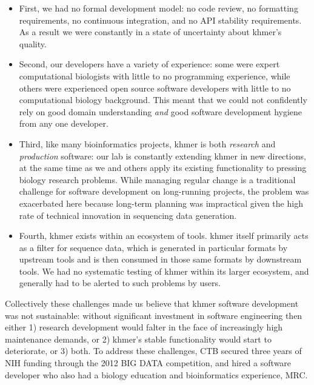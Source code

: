 \documentclass[11pt]{article}
\begin{document}
\begin{itemize}
\item First, we had no formal development model: no code review, no
  formatting requirements, no continuous integration, and no API
  stability requirements.  As a result we were constantly in a
  state of uncertainty about khmer's quality.

\item Second, our developers have a variety of experience: some were
  expert computational biologists with little to no programming
  experience, while others were experienced open source software
  developers with little to no computational biology background.  This
  meant that we could not confidently rely on good domain
  understanding {\em and} good software development hygiene from any
  one developer.

\item Third, like many bioinformatics projects, khmer is both {\em
  research} and {\em production} software: our lab is constantly
  extending khmer in new directions, at the same time as we and others
  apply its existing functionality to pressing biology research
  problems.  While managing regular change is a traditional challenge
  for software development on long-running projects, the problem was
  exacerbated here because long-term planning was impractical given
  the high rate of technical innovation in sequencing data generation.

\item Fourth, khmer exists within an ecosystem of tools.  khmer itself
  primarily acts as a filter for sequence data, which is generated in
  particular formats by upstream tools and is then consumed in those
  same formats by downstream tools.  We had no systematic testing of
  khmer within its larger ecosystem, and generally had to be alerted
  to such problems by users.

\end{itemize}

Collectively these challenges made us believe that khmer software
development was not sustainable: without significant investment in
software engineering then either 1) research development would falter in the
face of increasingly high maintenance demands, or 2) khmer's stable
functionality would start to deteriorate, or 3) both.  To address these
challenges, CTB secured three years of NIH funding through the 2012
BIG DATA competition, and hired a software developer who also had a biology
education and bioinformatics experience, MRC.
\end{document}
